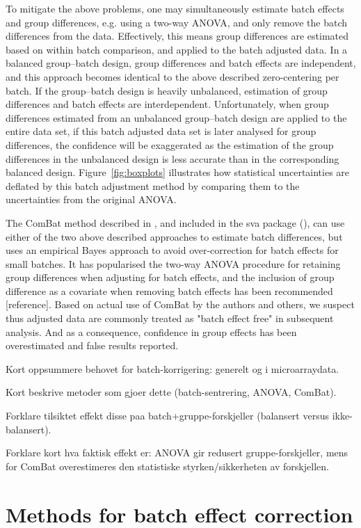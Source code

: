 \documentclass{bio}
\newcommand\NB[1]{{\color{red}#1}}
\newcommand\CITE[1]{{\color{magenta}[#1]}}
\begin{document}
To mitigate the above problems, one may simultaneously estimate batch effects and group differences, e.g. using a two-way ANOVA, and only remove the batch differences from the data. Effectively, this means group differences are estimated based on within batch comparison, and applied to the batch adjusted data. In a balanced group--batch design, group differences and batch effects are independent, and this approach becomes identical to the above described zero-centering per batch. If the group--batch design is heavily unbalanced, estimation of group differences and batch effects are interdependent. Unfortunately, when group differences estimated from an unbalanced group--batch design are applied to the entire data set, if this batch adjusted data set is later analysed for group differences, the confidence will be exaggerated as the estimation of the group differences in the unbalanced design is less accurate than in the corresponding balanced design. Figure~\ref{fig:boxplots} illustrates how statistical uncertainties are deflated by this batch adjustment method by comparing them to the uncertainties from the original ANOVA.

The ComBat method described in \citet{Johnson2007}, and included in the sva package (\citealp{Leek2012}), can use either of the two above described approaches to estimate batch differences, but uses an empirical Bayes approach to avoid over-correction for batch effects for small batches. It has popularised the two-way ANOVA procedure for retaining group differences when adjusting for batch effects, and the inclusion of group difference as a covariate when removing batch effects has been recommended \CITE{reference}. Based on actual use of ComBat by the authors and others, we suspect thus adjusted data are commonly treated as "batch effect free" in subsequent analysis. And as a consequence, confidence in group effects has been overestimated and false results reported.

\NB{Kort oppsummere behovet for batch-korrigering: generelt og i microarraydata.}

\NB{Kort beskrive metoder som gjoer dette (batch-sentrering, ANOVA, ComBat).}

\NB{Forklare tilsiktet effekt disse paa batch+gruppe-forskjeller (balansert versus ikke-balansert).}

\NB{Forklare kort hva faktisk effekt er: ANOVA gir redusert gruppe-forskjeller, mens for ComBat overestimeres den statistiske styrken/sikkerheten av forskjellen.}


\section{Methods for batch effect correction}
\end{document}
